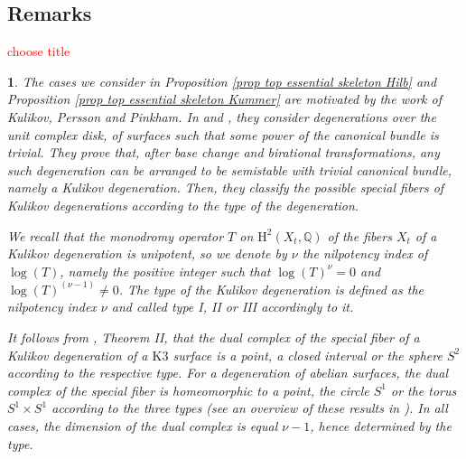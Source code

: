 \documentclass{amsart}%
\numberwithin{equation}{subsection}
\theoremstyle{plain2}
\theoremstyle{definition2}
\theoremstyle{stepstyle}
\theoremstyle{point}
\theoremstyle{subpoint}
\newtheorem{subpoint}[equation]{}%
\newcommand{\spa}[1]{\begin{subpoint}#1\end{subpoint}}           %
\newcommand{\Q}{\ensuremath{\mathbb{Q}}}
\begin{document}
\subsection{Remarks} \textcolor{red}{choose title}
\spa{The cases we consider in Proposition \ref{prop top essential skeleton Hilb} and Proposition \ref{prop top essential skeleton Kummer} are motivated by the work of Kulikov, Persson and Pinkham. In \cite{Kulikov} and \cite{PerssonPinkham1981}, they consider degenerations  over the unit complex disk, of surfaces such that some power of the canonical bundle is trivial. They prove that, after base change and birational transformations, any such degeneration can be arranged to be semistable with trivial canonical bundle, namely a \emph{Kulikov degeneration}. Then, they classify the possible special fibers of Kulikov degenerations according to the type of the degeneration.

We recall that the monodromy operator $T$ on $\text{H}^2(X_t, \Q)$ of the fibers $X_t$ of a Kulikov degeneration is unipotent, so we denote by $\nu$ the nilpotency index of $\log(T)$, namely the positive integer such that $\log(T)^\nu=0$ and $\log(T)^{(\nu-1)} \neq 0$. The type of the Kulikov degeneration is defined as the nilpotency index $\nu$ and called type I, II or III accordingly to it.

It follows from \cite{Kulikov}, Theorem II, that the dual complex of the special fiber of a Kulikov degeneration of a $\text{K}3$ surface is a point, a closed interval or the sphere $S^2$ according to the respective type. For a degeneration of abelian surfaces, the dual complex of the special fiber is homeomorphic to a point, the circle $S^1$ or the torus $S^1 \times S^1$ according to the three types (see an overview of these results in \cite{FriedmanMorrison}). In all cases, the dimension of the dual complex is equal $\nu-1$, hence determined by the type.
}
\end{document}
